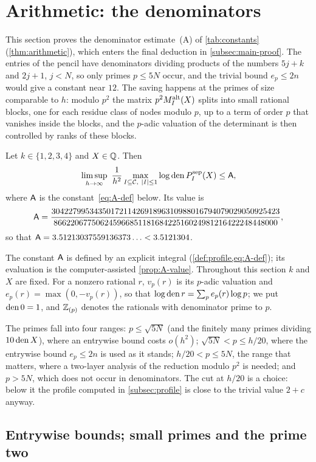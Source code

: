 \section{Arithmetic: the denominators}\label{sec:arithmetic}

This section proves the denominator estimate~(A) of \cref{tab:constants}
(\cref{thm:arithmetic}), which enters the final deduction in \cref{subsec:main-proof}. The
entries of the pencil have denominators dividing products of the numbers $5j+k$ and $2j+1$,
$j<N$, so only primes $p\le5N$ occur, and the trivial bound $e_p\le2n$ would give a constant
near $12$. The saving happens at the primes of size comparable to $h$: modulo $p^2$ the matrix
$p^2M^{\mathrm{alt}}_I(X)$ splits into small rational blocks, one for each residue class of nodes modulo
$p$, up to a term of order $p$ that vanishes inside the blocks, and the $p$-adic valuation of
the determinant is then controlled by ranks of these blocks.

\begin{theorem}\label{thm:arithmetic}
Let $k\in\{1,2,3,4\}$ and $X\in\mathbb{Q}$. Then
\[
  \limsup_{h\to\infty}\ \frac1{h^2}\max_{I\subseteq\Com,\ \abs I\le1}\log\den P^{\sep}_I(X)\le\cA,
\]
where $\mathsf{A}$ is the constant~\eqref{eq:A-def} below. Its value is
\[
  \mathsf{A}=\frac{304227995343501721142691896310988016794079029050925423}
           {86622067750624596685118168422516024981216422248448000},
\]
so that $\mathsf{A}=3.51213037559136373\ldots<3.5121304$.
\end{theorem}

The constant $\mathsf{A}$ is defined by an explicit integral (\cref{def:profile,eq:A-def}); its
evaluation is the computer-assisted \cref{prop:A-value}. Throughout this section $k$ and $X$ are
fixed. For a nonzero rational $r$, $v_p(r)$ is its $p$-adic valuation and
$e_p(r)=\max(0,-v_p(r))$, so that $\log\operatorname{den} r=\sum_pe_p(r)\log p$; we put $\operatorname{den}0=1$, and $\mathbb{Z}_{(p)}$
denotes the rationals with denominator prime to $p$.

The primes fall into four ranges: $p\le\sqrt{5N}$ (and the finitely many primes dividing
$10\operatorname{den} X$), where an entrywise bound costs $o(h^2)$; $\sqrt{5N}<p\le h/20$, where the
entrywise bound $e_p\le2n$ is used as it stands; $h/20<p\le5N$, the range that matters, where
a two-layer analysis of the reduction modulo $p^2$ is needed; and $p>5N$, which does not occur in
denominators. The cut at $h/20$ is a choice: below it the profile computed in
\cref{subsec:profile} is close to the trivial value $2+c$ anyway.

\subsection{Entrywise bounds; small primes and the prime two}\label{subsec:entry-bounds}

